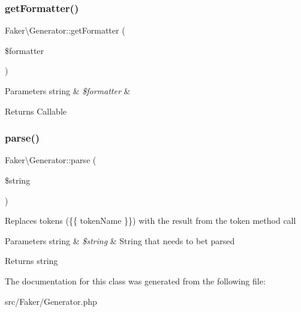\subsubsection{\texorpdfstring{get\+Formatter()}{getFormatter()}}
{\footnotesize\ttfamily Faker\textbackslash{}\+Generator\+::get\+Formatter (\begin{DoxyParamCaption}\item[{}]{\$formatter }\end{DoxyParamCaption})}


\begin{DoxyParams}[1]{Parameters}
string & {\em \$formatter} & \\
\hline
\end{DoxyParams}
\begin{DoxyReturn}{Returns}
Callable 
\end{DoxyReturn}
\mbox{\label{classFaker_1_1Generator_a546a92d05f70fe8716c5948a67fd276f}} 
\subsubsection{\texorpdfstring{parse()}{parse()}}
{\footnotesize\ttfamily Faker\textbackslash{}\+Generator\+::parse (\begin{DoxyParamCaption}\item[{}]{\$string }\end{DoxyParamCaption})}

Replaces tokens (\textquotesingle{}\{\{ token\+Name \}\}\textquotesingle{}) with the result from the token method call


\begin{DoxyParams}[1]{Parameters}
string & {\em \$string} & String that needs to bet parsed \\
\hline
\end{DoxyParams}
\begin{DoxyReturn}{Returns}
string 
\end{DoxyReturn}


The documentation for this class was generated from the following file\+:\begin{DoxyCompactItemize}
\item 
src/\+Faker/Generator.\+php\end{DoxyCompactItemize}

